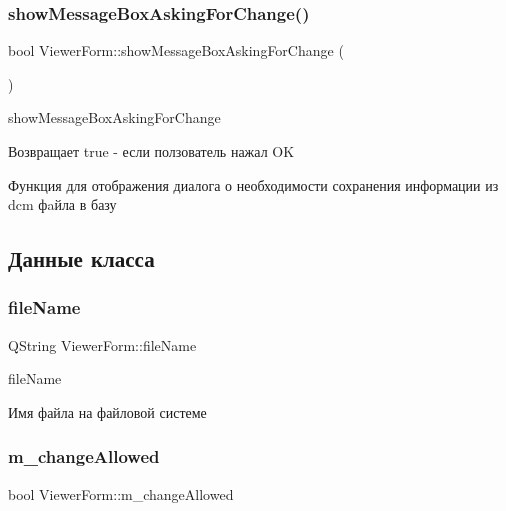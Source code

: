\subsubsection{\texorpdfstring{show\+Message\+Box\+Asking\+For\+Change()}{showMessageBoxAskingForChange()}}
{\footnotesize\ttfamily bool Viewer\+Form\+::show\+Message\+Box\+Asking\+For\+Change (\begin{DoxyParamCaption}{ }\end{DoxyParamCaption})\hspace{0.3cm}{\ttfamily [private]}}



show\+Message\+Box\+Asking\+For\+Change 

\begin{DoxyReturn}{Возвращает}
true -\/ если ползователь нажал OK
\end{DoxyReturn}
Функция для отображения диалога о необходимости сохранения информации из dcm фaйла в базу 

\subsection{Данные класса}
\mbox{\label{classViewerForm_ab2f0d1908098c723c3f52e89f69e46f4}} 
\subsubsection{\texorpdfstring{file\+Name}{fileName}}
{\footnotesize\ttfamily Q\+String Viewer\+Form\+::file\+Name}



file\+Name 

Имя файла на файловой системе \mbox{\label{classViewerForm_a38c70bda1c65ed5a26e06eb73233ffb2}} 
\subsubsection{\texorpdfstring{m\+\_\+change\+Allowed}{m\_changeAllowed}}
{\footnotesize\ttfamily bool Viewer\+Form\+::m\+\_\+change\+Allowed\hspace{0.3cm}{\ttfamily [private]}}



